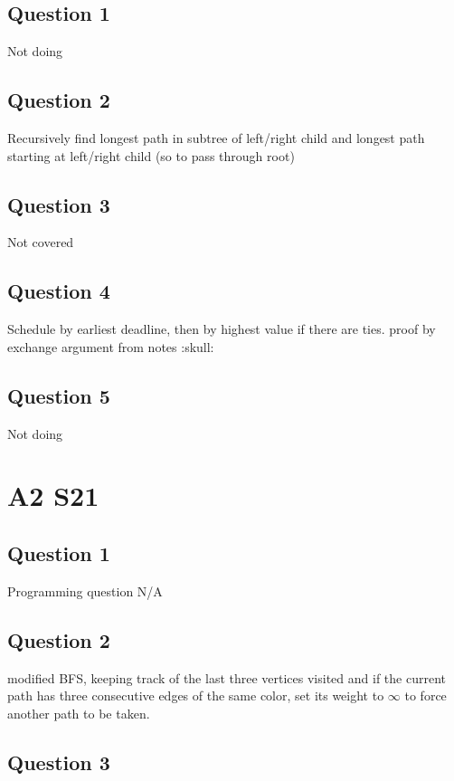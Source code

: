 \documentclass[11pt]{article}
\begin{document}
\subsection{Question 1}

Not doing

\subsection{Question 2}

Recursively find longest path in subtree of left/right child and longest path starting at left/right child (so to pass through root)

\subsection{Question 3} Not covered

\subsection{Question 4} Schedule by earliest deadline, then by highest value if there are ties. proof by exchange argument from notes :skull:

\subsection{Question 5} Not doing

\section{A2 S21}

\subsection{Question 1}

Programming question N/A

\subsection{Question 2}

modified BFS, keeping track of the last three vertices visited and if the current path has three consecutive edges of the same color, set its weight to $\infty$ to force another path to be taken.

\subsection{Question 3}
\end{document}

